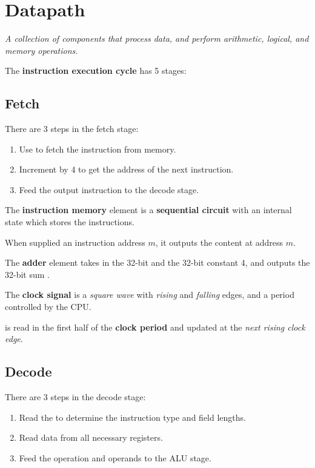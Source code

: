 \section{Datapath}
\textit{A collection of components that process data, and perform arithmetic, logical, and memory operations.}

The \textbf{instruction execution cycle} has 5 stages:
\begin{enumerate*}
\end{enumerate*}

\subsection{Fetch}
There are 3 steps in the fetch stage:
\begin{enumerate}
    \item Use  to fetch the instruction from memory.
    \item Increment  by 4 to get the address of the next instruction.
    \item Feed the output instruction to the decode stage.
\end{enumerate}

The \textbf{instruction memory} element is a \textbf{sequential circuit} with an internal
state which stores the instructions.

When supplied an instruction address $m$, it outputs the content at address $m$.

The \textbf{adder} element takes in the 32-bit  and the 32-bit constant 4, 
and outputs the 32-bit sum .

The \textbf{clock signal} is a \textit{square wave} with \textit{rising} and \textit{falling} edges,
and a period controlled by the CPU.

 is read in the first half of the \textbf{clock period} and updated
at the \textit{next rising clock edge}.

\subsection{Decode}
There are 3 steps in the decode stage:
\begin{enumerate}
    \item Read the  to determine the instruction type and field lengths.
    \item Read data from all necessary registers.
    \item Feed the operation and operands to the ALU stage.
\end{enumerate}

